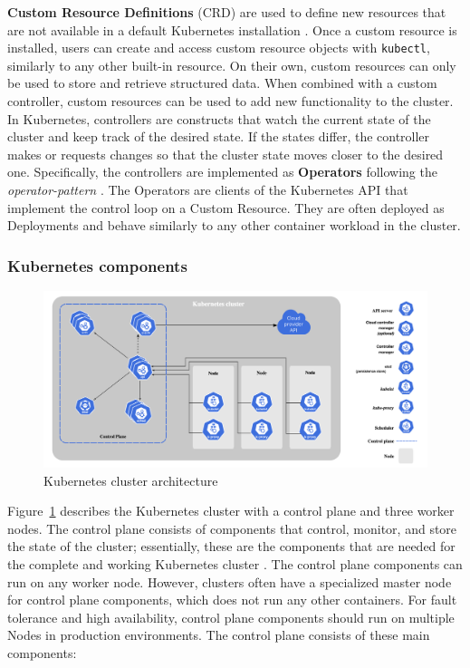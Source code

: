 \documentclass[english, 12pt, a4paper, sci, utf8, a-2b, online]{aaltothesis}
\begin{document}
\textbf{Custom Resource Definitions} (CRD) are used to define new resources that are not available in a default Kubernetes installation \cite{k8s-docs-crd}.
Once a custom resource is installed, users can create and access custom resource objects with \lstinline{kubectl}, similarly to any other built-in resource.
On their own, custom resources can only be used to store and retrieve structured data.
When combined with a custom controller, custom resources can be used to add new functionality to the cluster.
In Kubernetes, controllers are constructs that watch the current state of the cluster and keep track of the desired state.
If the states differ, the controller makes or requests changes so that the cluster state moves closer to the desired one.
Specifically, the controllers are implemented as \textbf{Operators} following the \emph{operator-pattern} \cite{k8s-docs-operators}.
The Operators are clients of the Kubernetes API that implement the control loop on a Custom Resource.
They are often deployed as Deployments and behave similarly to any other container workload in the cluster.

\subsubsection{Kubernetes components} \label{control-plane}

\begin{figure}[h!]
  \centering
  \includegraphics[width=\linewidth]{files/k8s-arch.png}
  \caption{Kubernetes cluster architecture \cite{k8s-docs-control-plane}}
  \label{figure-2}
\end{figure}

Figure~\ref{figure-2} describes the Kubernetes cluster with a control plane and three worker nodes.
The control plane consists of components that control, monitor, and store the state of the cluster; essentially, these are the components that are needed for the complete and working Kubernetes cluster \cite{k8s-docs-control-plane}.
The control plane components can run on any worker node.
However, clusters often have a specialized master node for control plane components, which does not run any other containers.
For fault tolerance and high availability, control plane components should run on multiple Nodes in production environments.
The control plane consists of these main components:
\end{document}
